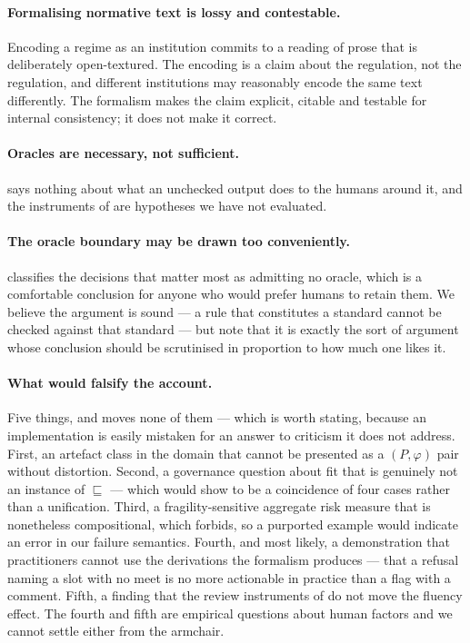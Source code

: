 \documentclass[11pt,a4paper]{article}
\renewcommand{\_}{\oldunderscore\allowbreak}
\theoremstyle{plain}
\theoremstyle{definition}
\theoremstyle{definition}
\theoremstyle{remark}
\begin{document}
\paragraph{Formalising normative text is lossy and contestable.} Encoding a regime as an institution commits
to a reading of prose that is deliberately open-textured. The encoding is a claim about the regulation, not
the regulation, and different institutions may reasonably encode the same text differently. The formalism
makes the claim explicit, citable and testable for internal consistency; it does not make it correct.

\paragraph{Oracles are necessary, not sufficient.}  says nothing about what an
unchecked output does to the humans around it, and the instruments of  are hypotheses we
have not evaluated.

\paragraph{The oracle boundary may be drawn too conveniently.}  classifies the
decisions that matter most as admitting no oracle, which is a comfortable conclusion for anyone who would
prefer humans to retain them. We believe the argument is sound --- a rule that constitutes a standard cannot
be checked against that standard --- but note that it is exactly the sort of argument whose conclusion should
be scrutinised in proportion to how much one likes it.

\paragraph{What would falsify the account.} Five things, and  moves none of them
--- which is worth stating, because an implementation is easily mistaken for an answer to criticism it does
not address. First, an artefact class in the domain that cannot be
presented as a $(P, \varphi)$ pair without distortion. Second, a governance question about fit that is
genuinely not an instance of $\sqsubseteq$ --- which would show  to be a coincidence of
four cases rather than a unification. Third, a fragility-sensitive aggregate risk measure that is nonetheless
compositional, which  forbids, so a purported example would indicate an error in our failure
semantics. Fourth, and most likely, a demonstration that practitioners cannot use the derivations the
formalism produces --- that a refusal naming a slot with no meet is no more actionable in practice than a flag
with a comment. Fifth, a finding that the review instruments of  do not move the fluency
effect. The fourth and fifth are empirical questions about human factors and we cannot settle either from the
armchair.
\end{document}
